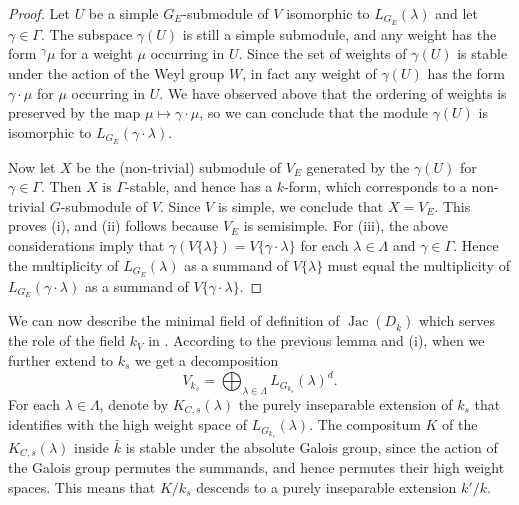 \documentclass[11pt,reqno]{amsart}
\theoremstyle{definition}
\theoremstyle{remark}
\theoremstyle{definition}
\theoremstyle{plain}
\DeclareMathOperator{\Jac}{Jac}
\newcommand{\bark}{{\overline{k}}}
\begin{document}
\begin{proof}
Let $U$ be a simple $G_E$-submodule of $V$ isomorphic to $L_{G_E}(\lambda)$ and let $\gamma\in \Gamma$. The subspace $\gamma(U)$ is still a simple submodule, and any weight has the form ${^\gamma}\mu$ for a weight $\mu$ occurring in $U$.
Since the set of weights of $\gamma(U)$ is stable under the action of the Weyl group $W$, in fact any weight of $\gamma(U)$ has the form $\gamma\cdot\mu$ for
$\mu$ occurring in $U$. 
We have observed above that the ordering of weights is preserved by the map $\mu\mapsto \gamma\cdot\mu$,
so we can conclude that the module $\gamma(U)$ is isomorphic to $L_{G_E}(\gamma\cdot\lambda)$.

Now let $X$ be the (non-trivial) submodule of $V_E$ generated by the $\gamma(U)$ for $\gamma\in \Gamma$.
Then $X$ is $\Gamma$-stable, and hence has a $k$-form, which corresponds to a non-trivial $G$-submodule of $V$.
Since $V$ is simple, we conclude that $X = V_E$.
This proves (i), and (ii) follows because $V_E$ is semisimple.
For (iii), the above considerations imply that $\gamma(V\{\lambda\}) = V\{\gamma\cdot\lambda\}$ for each $\lambda\in \Lambda$ and $\gamma\in \Gamma$.
Hence the multiplicity of $L_{G_E}(\lambda)$ as a summand of $V\{\lambda\}$ must equal the multiplicity of $L_{G_E}(\gamma\cdot\lambda)$ as a summand of $V\{\gamma\cdot\lambda\}$.
\end{proof}

We can now describe the minimal field of definition of $\Jac(D_\bark)$ which serves the role of the field $k_V$ in .
According to the previous lemma and (i), when we further extend to $k_s$ we get a decomposition 
\begin{equation}\label{ksdecomp}
V_{k_s} = \bigoplus_{\lambda\in \Lambda} L_{G_{k_s}}(\lambda)^d.
\end{equation}
For each $\lambda\in \Lambda$, denote by $K_{C,s}(\lambda)$ the purely inseparable extension of $k_s$ that identifies with the high weight space of $L_{G_{k_s}}(\lambda)$.
The compositum $K$ of the $K_{C,s}(\lambda)$ inside $\bar{k}$ is stable under the absolute Galois group, since the action of the Galois group permutes the summands, and hence permutes their high weight spaces.
This means that $K/k_s$ descends to a purely inseparable extension $k'/k$. 
\end{document}
